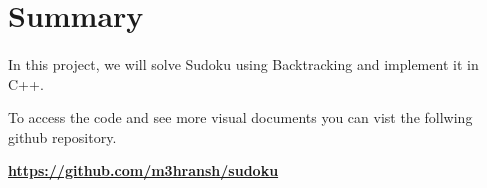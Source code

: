 \section*{Summary}
\paragraph{}
In this project, we will solve Sudoku using Backtracking and implement it in C++.

To access the code and see more visual documents you can vist
the follwing github repository.

\href{https://github.com/m3hransh/sudoku}{\textbf{https://github.com/m3hransh/sudoku}}